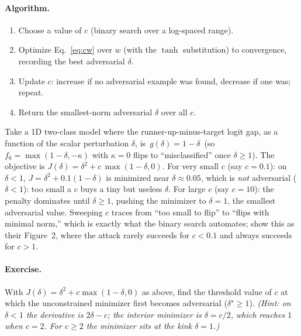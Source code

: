 \paragraph{Algorithm.}
\begin{enumerate}[label=\textbf{\arabic*.},nosep]
  \item Choose a value of $c$ (binary search over a log-spaced range).
  \item Optimize Eq.~\eqref{eq:cw} over $w$ (with the $\tanh$ substitution) to convergence, recording the best adversarial $\delta$.
  \item Update $c$: increase if no adversarial example was found, decrease if one was; repeat.
  \item Return the smallest-norm adversarial $\delta$ over all $c$.
\end{enumerate}

\begin{example}
Take a 1D two-class model where the runner-up-minus-target logit gap, as a function of the scalar perturbation $\delta$, is $\,g(\delta)=1-\delta\,$ (so $f_6=\max(1-\delta,-\kappa)$ with $\kappa=0$ flips to ``misclassified'' once $\delta\ge1$). The objective is $J(\delta)=\delta^2 + c\,\max(1-\delta,0)$. For very small $c$ (say $c=0.1$): on $\delta<1$, $J=\delta^2+0.1(1-\delta)$ is minimized near $\delta\approx0.05$, which is \emph{not} adversarial ($\delta<1$): too small a $c$ buys a tiny but useless $\delta$. For large $c$ (say $c=10$): the penalty dominates until $\delta\ge1$, pushing the minimizer to $\delta=1$, the smallest adversarial value. Sweeping $c$ traces from ``too small to flip'' to ``flips with minimal norm,'' which is exactly what the binary search automates; \citet{carlini2017towards} show this as their Figure~2, where the attack rarely succeeds for $c<0.1$ and always succeeds for $c>1$.
\end{example}

\paragraph{Exercise.} With $J(\delta)=\delta^2+c\max(1-\delta,0)$ as above, find the threshold value of $c$ at which the unconstrained minimizer first becomes adversarial ($\delta^\star\ge1$). \emph{(Hint: on $\delta<1$ the derivative is $2\delta-c$; the interior minimizer is $\delta=c/2$, which reaches $1$ when $c=2$. For $c\ge2$ the minimizer sits at the kink $\delta=1$.)}

